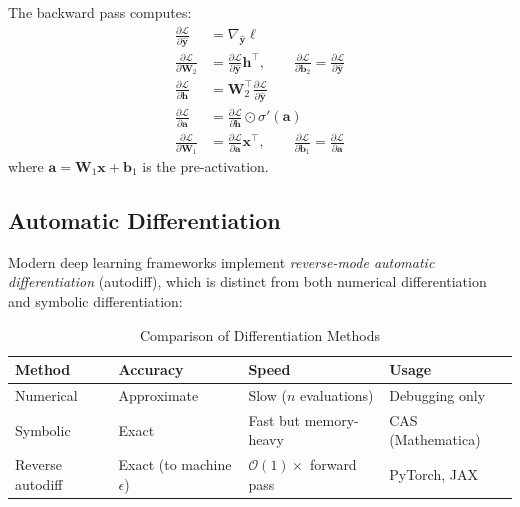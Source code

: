 The backward pass computes:
\begin{align}
\frac{\partial \mathcal{L}}{\partial \hat{\mathbf{y}}} &= \nabla_{\hat{\mathbf{y}}} \ell \\
\frac{\partial \mathcal{L}}{\partial \mathbf{W}_2} &= \frac{\partial \mathcal{L}}{\partial \hat{\mathbf{y}}} \mathbf{h}^\top, \qquad \frac{\partial \mathcal{L}}{\partial \mathbf{b}_2} = \frac{\partial \mathcal{L}}{\partial \hat{\mathbf{y}}} \\
\frac{\partial \mathcal{L}}{\partial \mathbf{h}} &= \mathbf{W}_2^\top \frac{\partial \mathcal{L}}{\partial \hat{\mathbf{y}}} \\
\frac{\partial \mathcal{L}}{\partial \mathbf{a}} &= \frac{\partial \mathcal{L}}{\partial \mathbf{h}} \odot \sigma'(\mathbf{a}) \\
\frac{\partial \mathcal{L}}{\partial \mathbf{W}_1} &= \frac{\partial \mathcal{L}}{\partial \mathbf{a}} \mathbf{x}^\top, \qquad \frac{\partial \mathcal{L}}{\partial \mathbf{b}_1} = \frac{\partial \mathcal{L}}{\partial \mathbf{a}}
\end{align}
where $\mathbf{a} = \mathbf{W}_1 \mathbf{x} + \mathbf{b}_1$ is the pre-activation.

\subsection{Automatic Differentiation}

Modern deep learning frameworks implement \emph{reverse-mode automatic differentiation} (autodiff), which is distinct from both numerical differentiation and symbolic differentiation:

\begin{table}[ht]
    \centering
    \caption{Comparison of Differentiation Methods}
    \begin{tabular}{L{3cm} L{3.5cm} L{3.5cm} L{3cm}}
        \toprule
        \textbf{Method} & \textbf{Accuracy} & \textbf{Speed} & \textbf{Usage} \\
        \midrule
        Numerical & Approximate & Slow ($n$ evaluations) & Debugging only \\
        Symbolic & Exact & Fast but memory-heavy & CAS (Mathematica) \\
        Reverse autodiff & Exact (to machine $\epsilon$) & $\mathcal{O}(1)\times$ forward pass & PyTorch, JAX \\
        \bottomrule
    \end{tabular}
\end{table}

